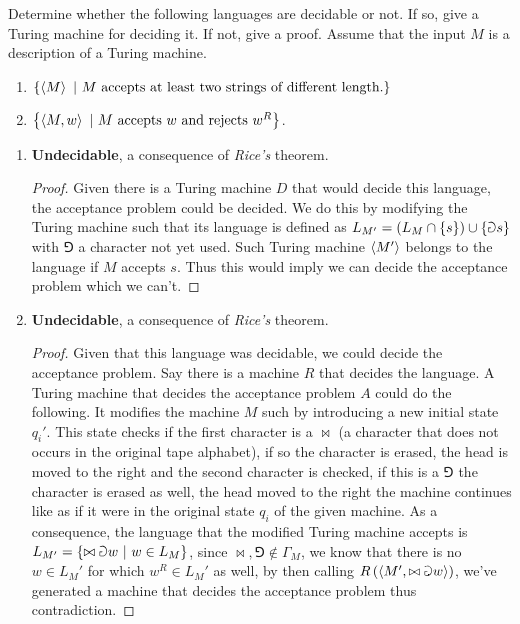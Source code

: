 \documentclass{article}
\begin{document}
\begin{exercise}
Determine whether the following languages are decidable or not. If so, give a Turing machine for deciding it. If not, give a proof. Assume that the input $M$ is a description of a Turing machine.
\begin{enumerate}
 \item $\left\{ \left\langle M \right\rangle\ |\ \mbox{$M$ accepts at least two strings of different length.} \right\}$
 \item $\left\{ \left\langle M,w \right\rangle\ |\ \mbox{$M$ accepts $w$ and rejects $w^R$} \right\}$.
\end{enumerate}
\end{exercise}
\begin{answer}
\begin{enumerate}
 \item \textbf{Undecidable}, a consequence of \emph{Rice's} theorem.
 \begin{proof}
  Given there is a Turing machine $D$ that would decide this language, the acceptance problem could be decided. We do this by modifying the Turing machine such that its language is defined as $L_{M'}=\left( L_M\cap\left\{ s \right\} \right)\cup\left\{ \Game s \right\}$ with $\Game$ a character not yet used. Such Turing machine $\left\langle M' \right\rangle$ belongs to the language if $M$ accepts $s$. Thus this would imply we can decide the acceptance problem which we can't.
 \end{proof}
 \item \textbf{Undecidable}, a consequence of \emph{Rice's} theorem.
 \begin{proof}Given that this language was decidable, we could decide the acceptance problem. Say there is a machine $R$ that decides the language. A Turing machine that decides the acceptance problem $A$ could do the following. It modifies the machine $M$ such by introducing a new initial state $q_i'$. This state checks if the first character is a $\bowtie$ (a character that does not occurs in the original tape alphabet), if so the character is erased, the head is moved to the right and the second character is checked, if this is a $\Game$ the character is erased as well, the head moved to the right the machine continues like as if it were in the original state $q_i$ of the given machine. As a consequence, the language that the modified Turing machine accepts is $L_{M'}=\left\{ \bowtie\Game w\ |\ w\in L_M \right\}$, since $\bowtie,\Game\notin\Gamma_M$, we know that there is no $w\in L_M'$ for which $w^R\in L_M'$ as well, by then calling $R\left( \left\langle M',\bowtie\Game w \right\rangle \right)$, we've generated a machine that decides the acceptance problem thus contradiction.\end{proof}
\end{enumerate}
\end{answer}
\end{document}
